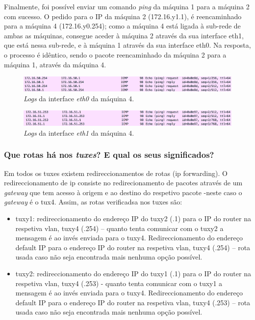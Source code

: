 \documentclass[a4paper, 11pt]{article}
\begin{document}
Finalmente, foi possível enviar um comando \textit{ping} da máquina 1 para a máquina 2 com sucesso. O pedido para o IP da máquina 2 (172.16.y1.1), é reencaminhado para a máquina 4 (172.16.y0.254); como a máquina 4 está ligada à sub-rede de ambas as máquinas, consegue aceder à máquina 2 através da sua interface eth1, que está nessa sub-rede, e à máquina 1 através da sua interface eth0. Na resposta, o processo é idêntico, sendo o pacote reencaminhado da máquina 2 para a máquina 1, através da máquina 4.
\begin{figure}[h]
\centering
\includegraphics[scale=0.5]{images/Exp3_tux4eth0ping.png}
\caption{\textit{Logs} da interface \textit{eth0} da máquina 4.}
\label{Momentanpol}
\end{figure}
\begin{figure}[h]
\centering
\includegraphics[scale=0.5]{images/Exp3_tux4eth1ping.png}
\caption{\textit{Logs} da interface \textit{eth1} da máquina 4.}
\label{Momentanpol}
\end{figure}

\subsubsection{Que rotas há nos \textit{tuxes}? E qual os seus significados?}
Em todos os tuxes existem redireccionamentos de rotas (ip forwarding). O redireccionamento de ip consiste no redirecionamento de pacotes através de um \textit{gateway} que tem acesso à origem e ao destino do respetivo pacote -neste caso o \textit{gateway} é o tux4. Assim, as rotas verificadsa nos tuxes são:

\begin{itemize}
\item tuxy1: redireccionamento do endereço IP do tuxy2 (.1) para o IP do router na respetiva vlan, tuxy4 (.254) – quanto tenta comunicar com o tuxy2 a mensagem é ao invés enviada para o tuxy4. Redireccionamento do endereço default IP para o endereço IP do router na respetiva vlan, tuxy4 (.254) – rota usada caso não seja encontrada mais nenhuma opção possível.
\item tuxy2: redireccionamento do endereço IP do tuxy1 (.1) para o IP do router na respetiva vlan, tuxy4 (.253) - quanto tenta comunicar com o tuxy1 a mensagem é ao invés enviada para o tuxy4. Redireccionamento do endereço default IP para o endereço IP do router na respetiva vlan, tuxy4 (.253) – rota usada caso não seja encontrada mais nenhuma opção possível.
\end{itemize}
\end{document}
